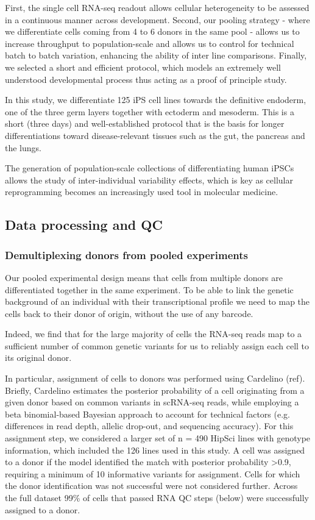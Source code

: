 First, the single cell RNA-seq readout allows cellular heterogeneity to be assessed in a continuous manner across development.
Second, our pooling strategy - where we differentiate cells coming from 4 to 6 donors in the same pool - allows us to increase throughput to population-scale and allows us to control for technical batch to batch variation, enhancing the ability of inter line comparisons.
Finally, we selected a short and efficient protocol, which models an extremely well understood developmental process thus acting as a proof of principle study.

In this study, we differentiate 125 iPS cell lines towards the definitive endoderm, one of the three germ layers together with ectoderm and mesoderm. 
This is a short (three days) and well-established protocol that is the basis for longer differentiations toward disease-relevant tissues such as the gut, the pancreas and the lungs.

The generation of population-scale collections of differentiating human iPSCs allows the study of inter-individual variability effects, which is key as cellular reprogramming becomes an increasingly used tool in molecular medicine.


\subsection{Data processing and QC}


\subsubsection{Demultiplexing donors from pooled experiments} 

Our pooled experimental design means that cells from multiple donors are differentiated together in the same experiment. 
To be able to link the genetic background of an individual with their transcriptional profile we need to map the cells back to their donor of origin, without the use of any barcode.

Indeed, we find that for the large majority of cells the RNA-seq reads map to a sufficient number of common genetic variants for us to reliably assign each cell to its original donor.

In particular, assignment of cells to donors was performed using Cardelino (ref). 
Briefly, Cardelino estimates the posterior probability of a cell originating from a given donor based on common variants in scRNA-seq reads, while employing a beta binomial-based Bayesian approach to account for technical factors (e.g. differences in read depth, allelic drop-out, and sequencing accuracy). 
For this assignment step, we considered a larger set of n = 490 HipSci lines with genotype information, which included the 126 lines used in this study. 
A cell was assigned to a donor if the model identified the match with posterior probability >0.9, requiring a minimum of 10 informative variants for assignment. 
Cells for which the donor identification was not successful were not considered further.
Across the full dataset 99\% of cells that passed RNA QC steps (below) were successfully assigned to a donor.

